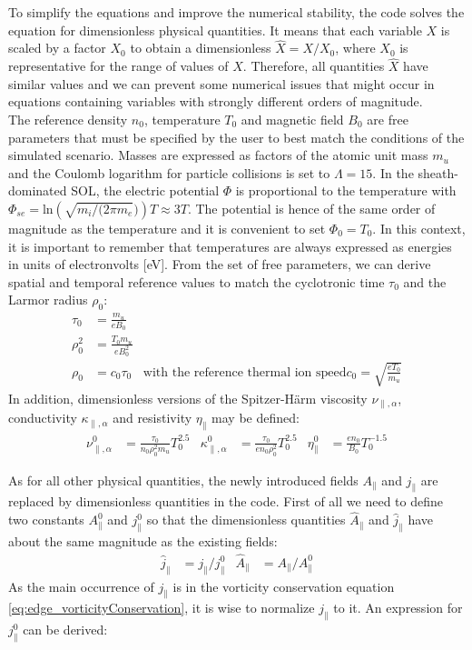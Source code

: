 To simplify the equations and improve the numerical stability, the code solves the equation for dimensionless physical quantities. It means that each variable $X$ is scaled by a factor $X_0$ to obtain a dimensionless $\hat{X} = X/X_0$, where $X_0$ is representative for the range of values of $X$. Therefore, all quantities $\hat{X}$ have similar values and we can prevent some numerical issues that might occur in equations containing variables with strongly different orders of magnitude. \\

The reference density $n_0$, temperature $T_0$ and magnetic field $B_0$ are free parameters that must be specified by the user to best match the conditions of the simulated scenario. Masses are expressed as factors of the atomic unit mass $m_u$ and the Coulomb logarithm for particle collisions is set to $\Lambda = 15$. In the sheath-dominated SOL, the electric potential $\Phi$ is proportional to the temperature with $\Phi_{se} = $ln$\left(\sqrt{m_i/(2\pi m_e})\right)T\approx3T$. The potential is hence of the same order of magnitude as the temperature and it is convenient to set $\Phi_0 = T_0$. In this context, it is important to remember that temperatures are always expressed as energies in units of electronvolts [eV]. From the set of free parameters, we can derive spatial and temporal reference values to match the cyclotronic time $\tau_0$ and the Larmor radius $\rho_0$:
\begin{align}
	\tau_0 &= \frac{m_u}{eB_0} \\
	\rho_0^2 &= \frac{T_0m_u}{eB_0^2} \\
	\rho_0 &= c_0 \tau_0 & \text{with the reference thermal ion speed} c_0 = \sqrt{\frac{eT_0}{m_u}}
\end{align}
In addition, dimensionless versions of the Spitzer-Härm viscosity $\nu_{\parallel,\alpha}$, conductivity $\kappa_{\parallel,\alpha}$ and resistivity $\eta_\parallel$ may be defined:
\begin{align}
	\nu_{\parallel,\alpha}^0 &= \frac{\tau_0}{n_0\rho_0^2m_u}T_0^{2.5} & %
	\kappa_{\parallel,\alpha}^0 &= \frac{\tau_0}{en_0\rho_0^2}T_0^{2.5} & %
	\eta_\parallel^0 &= \frac{en_0}{B_0}T_0^{-1.5} %
\end{align}

As for all other physical quantities, the newly introduced fields $A_\parallel$ and $j_\parallel$ are replaced by dimensionless quantities in the code. First of all we need to define two constants $A_\parallel^0$ and $j_\parallel^0$ so that the dimensionless quantities $\hat{A}_\parallel$ and $\hat{j}_\parallel$ have about the same magnitude as the existing fields:
\begin{align}
	\hat{j}_\parallel &= j_\parallel / j_\parallel^0 & \hat{A}_\parallel &= A_\parallel / A_\parallel^0
\end{align}
As the main occurrence of $j_\parallel$ is in the vorticity conservation equation \ref{eq:edge_vorticityConservation}, it is wise to normalize $j_\parallel$ to it. An expression for $j_\parallel^0$ can be derived:

